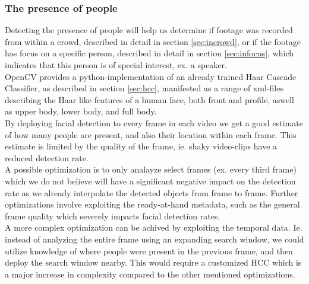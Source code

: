 \subsubsection{The presence of people}\label{sec:peopledata}
%
Detecting the presence of people will help us determine if footage was recorded from within a crowd, described in detail in section \ref{sec:incrowd}, or if the footage has focus on a specific person, described in detail in section \ref{sec:infocus}, which indicates that this person is of special interest, ex. a speaker.\\
%
OpenCV provides a python-implementation of an already trained Haar Cascade Classifier, as described in section \ref{sec:hcc}, manifested as a range of xml-files describing the Haar like features of a human face, both front and profile, aswell as upper body, lower body, and full body.\\
By deploying facial detection to every frame in each video we get a good estimate of how many people are present, and also their location within each frame. This estimate is limited by the quality of the frame, ie. shaky video-clips have a reduced detection rate.\\
%
A possible optimization is to only analayze select frames (ex. every third frame) which we do not believe will have a significant negative impact on the detection rate as we already interpolate the detected objects from frame to frame. Further optimizations involve exploiting the ready-at-hand metadata, such as the general frame quality which severely impacts facial detection rates.\\
A more complex optimization can be achived by exploiting the temporal data. Ie. instead of analyzing the entire frame using an expanding search window, we could utilize knowledge of where people were present in the previous frame, and then deploy the search window nearby. This would require a customized HCC which is a major increase in complexity compared to the other mentioned optimizations.
%
%
